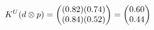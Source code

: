 \documentclass[preview]{standalone}
\begin{document}
\begin{align*}
\special{dvisvgm:raw <g id='unique000'>}K^U(d \otimes p) = \begin{pmatrix} (0.82)(0.74) \\ (0.84)(0.52) \end{pmatrix} = \begin{pmatrix} 0.60 \\ 0.44 \end{pmatrix}\special{dvisvgm:raw </g>}
\end{align*}
\end{document}
